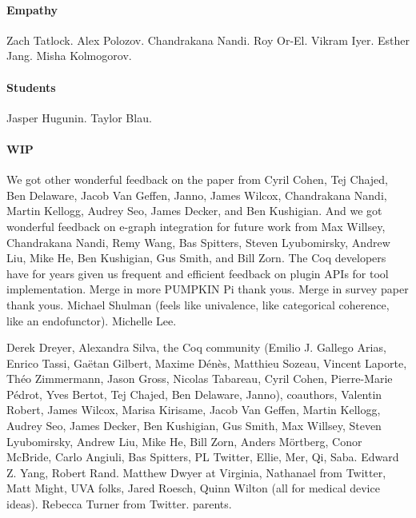 \documentclass[ twoside,openright,titlepage,numbers=noenddot,headinclude,
                footinclude=true,cleardoublepage=empty,abstractoff,%
                BCOR=5mm,paper=letter,fontsize=11pt,letterpaper,%
                american,%
                ]{scrreprt}
\begin{document}
\paragraph{Empathy}
Zach Tatlock.
Alex Polozov.
Chandrakana Nandi.
Roy Or-El.
Vikram Iyer.
Esther Jang.
Misha Kolmogorov.

\paragraph{Students}
Jasper Hugunin.
Taylor Blau.

\paragraph{WIP}
We got other wonderful feedback on the paper from 
Cyril Cohen, Tej Chajed, Ben Delaware, Jacob Van Geffen, Janno, James Wilcox, Chandrakana Nandi, 
Martin Kellogg, Audrey Seo, James Decker,
and Ben Kushigian.
And we got wonderful feedback on e-graph integration for future work from 
Max Willsey, Chandrakana Nandi, Remy Wang, Bas Spitters, Steven Lyubomirsky, Andrew Liu, Mike He, Ben Kushigian, 
Gus Smith, and Bill Zorn.
The Coq developers have for years given us frequent and efficient feedback on plugin APIs for tool implementation.
Merge in more PUMPKIN Pi thank yous. Merge in survey paper thank yous.
Michael Shulman (feels like univalence, like categorical coherence, like an endofunctor).
Michelle Lee.

Derek Dreyer, Alexandra Silva, the Coq community (Emilio J. Gallego Arias, Enrico Tassi, Ga\"{e}tan Gilbert, Maxime D\'{e}n\`{e}s,
Matthieu Sozeau, Vincent Laporte, Th\'{e}o Zimmermann, Jason Gross, Nicolas Tabareau, Cyril Cohen, Pierre-Marie P\'{e}drot, Yves Bertot, Tej Chajed, Ben Delaware, Janno), coauthors, Valentin Robert, James Wilcox, Marisa Kirisame,
Jacob Van Geffen, Martin Kellogg, Audrey Seo, James Decker, Ben Kushigian, Gus Smith,
Max Willsey, Steven Lyubomirsky, Andrew Liu, Mike He, Bill Zorn,
Anders M\"ortberg, Conor McBride, Carlo Angiuli, Bas Spitters, 
PL Twitter, Ellie, Mer, Qi, Saba.
Edward Z. Yang, Robert Rand.
Matthew Dwyer at Virginia, Nathanael from Twitter, Matt Might, UVA folks, Jared Roesch, Quinn Wilton (all for medical device ideas).
Rebecca Turner from Twitter.
parents.


\cleardoublepage













\printindex

%



\end{document}
